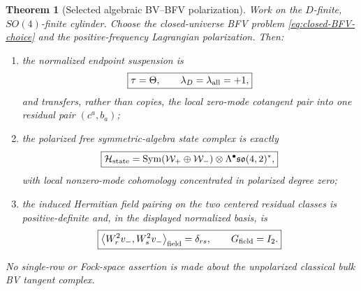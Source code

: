 \documentclass[11pt]{article}
\newtheorem{theorem}{Theorem}[section]
\theoremstyle{definition}
\theoremstyle{remark}
\newcommand{\W}{\mathcal W}
\newcommand{\cH}{\mathcal H}
\begin{document}
\begin{theorem}[Selected algebraic BV--BFV polarization]
\label{thm:pure-weyl-polarized}
Work on the $D$-finite, $SO(4)$-finite cylinder.  Choose the closed-universe
BFV problem \eqref{eq:closed-BFV-choice} and the positive-frequency
Lagrangian polarization.  Then:
\begin{enumerate}
\item the normalized endpoint suspension is
\begin{equation}\label{eq:tau-equals-theta}
 \boxed{\tau=\Theta,\qquad\lambda_D=\lambda_{\rm all}=+1,}
\end{equation}
and transfers, rather than copies, the local zero-mode cotangent pair into
one residual pair $(c^a,b_a)$;
\item the polarized free symmetric-algebra state complex is exactly
\begin{equation}\label{eq:polarized-state-complex}
 \boxed{
 \cH_{\rm state}
 =\operatorname{Sym}(\W_+\oplus\W_-)
 \otimes\Lambda^\bullet\mathfrak{so}(4,2)^*,}
\end{equation}
with local nonzero-mode cohomology concentrated in polarized degree zero;
\item the induced Hermitian field pairing on the two centered residual
classes is positive-definite and, in the displayed normalized basis, is
\begin{equation}\label{eq:field-I2}
 \boxed{
 \left\langle W_r^2v_-,W_s^2v_-\right\rangle_{\rm field}
 =\delta_{rs},\qquad G_{\rm field}=I_2.}
\end{equation}
\end{enumerate}
No single-row or Fock-space assertion is made about the unpolarized classical
bulk BV tangent complex.
\end{theorem}
\end{document}
